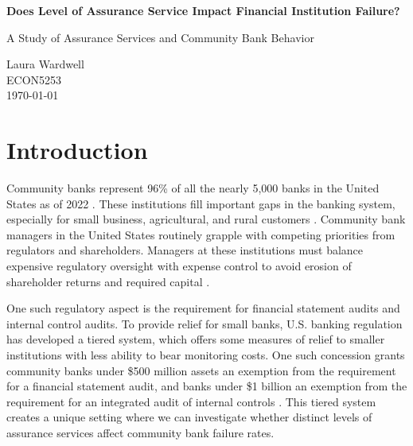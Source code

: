 \documentclass[12pt]{article}
\begin{document}
\begin{titlepage}
    \begin{center}
        \vspace*{1cm}
        
        \Huge
        \textbf{Does Level of Assurance Service Impact Financial Institution Failure?}
        
        \vspace{0.5cm}
        \LARGE
        A Study of Assurance Services and Community Bank Behavior
        
        \vspace{1.5cm}
        
        \vfill
        
        \Large
        Laura Wardwell\\ 
        ECON5253\\
        \today
    \end{center}
\end{titlepage}

\section{Introduction}

Community banks represent 96\% of all the nearly 5,000 banks in the United States as of 2022 \citep{KandracMarsh2025}. These institutions fill important gaps in the banking system, especially for small business, agricultural, and rural customers \citep{ICBA2024, KandracMarsh2025}. Community bank managers in the United States routinely grapple with competing priorities from regulators and shareholders. Managers at these institutions must balance expensive regulatory oversight with expense control to avoid erosion of shareholder returns and required capital \citep{KandracMarsh2025}.

One such regulatory aspect is the requirement for financial statement audits and internal control audits. To provide relief for small banks, U.S. banking regulation has developed a tiered system, which offers some measures of relief to smaller institutions with less ability to bear monitoring costs. One such concession grants community banks under \$500 million assets an exemption from the requirement for a financial statement audit, and banks under \$1 billion an exemption from the requirement for an integrated audit of internal controls \citep{Jin2013a, Jin2013b}. This tiered system creates a unique setting where we can investigate whether distinct levels of assurance services affect community bank failure rates.
\end{document}

